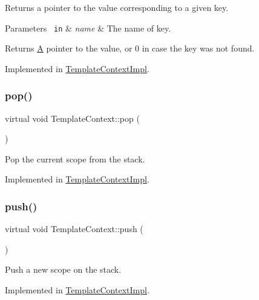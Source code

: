 Returns a pointer to the value corresponding to a given key. 
\begin{DoxyParams}[1]{Parameters}
\mbox{\texttt{ in}}  & {\em name} & The name of key. \\
\hline
\end{DoxyParams}
\begin{DoxyReturn}{Returns}
\mbox{\hyperlink{class_a}{A}} pointer to the value, or 0 in case the key was not found. 
\end{DoxyReturn}


Implemented in \mbox{\hyperlink{class_template_context_impl_aba8ebc4a96d6a1a52f0f16d00a658770}{Template\+Context\+Impl}}.

\mbox{\label{class_template_context_a853868792ccd7f9c5fed55338d23d019}} 
\subsubsection{\texorpdfstring{pop()}{pop()}}
{\footnotesize\ttfamily virtual void Template\+Context\+::pop (\begin{DoxyParamCaption}{ }\end{DoxyParamCaption})\hspace{0.3cm}{\ttfamily [pure virtual]}}

Pop the current scope from the stack. 

Implemented in \mbox{\hyperlink{class_template_context_impl_af8856e3207a53fad3f700353d71b575e}{Template\+Context\+Impl}}.

\mbox{\label{class_template_context_aac3a3e3c8e604db05e74cba7b1ce8554}} 
\subsubsection{\texorpdfstring{push()}{push()}}
{\footnotesize\ttfamily virtual void Template\+Context\+::push (\begin{DoxyParamCaption}{ }\end{DoxyParamCaption})\hspace{0.3cm}{\ttfamily [pure virtual]}}

Push a new scope on the stack. 

Implemented in \mbox{\hyperlink{class_template_context_impl_a006f67f94724147908dda84dd8522d34}{Template\+Context\+Impl}}.

